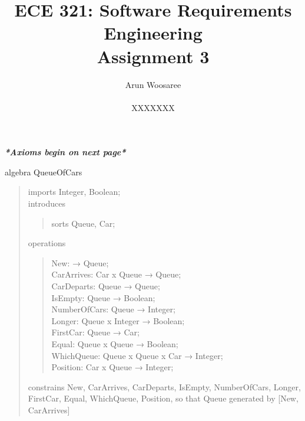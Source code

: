 \documentclass[letterpaper,12pt]{article}
\title{ECE 321: Software Requirements Engineering \\ Assignment 3}
\author{Arun Woosaree \\ \\ XXXXXXX}
\begin{document}
\maketitle
\begin{center}
 \textit{\textbf{*Axioms begin on next page*}}
\end{center}
algebra QueueOfCars
\begin{quote}
 imports Integer, Boolean;\\
 introduces
 \begin{quote}
  sorts Queue, Car;
 \end{quote}
 operations
 \begin{quote}
  New: → Queue;\\
  CarArrives: Car x Queue → Queue;\\
  CarDeparts: Queue → Queue;\\
  IsEmpty: Queue → Boolean;\\
  NumberOfCars: Queue → Integer;\\
  Longer: Queue x Integer → Boolean;\\
  FirstCar: Queue → Car;\\
  Equal: Queue x Queue → Boolean;\\
  WhichQueue: Queue x Queue x Car → Integer;\\
  Position: Car x Queue → Integer;
 \end{quote}
 constrains New, CarArrives, CarDeparts, IsEmpty, NumberOfCars, Longer, FirstCar, Equal, WhichQueue, Position, so that Queue generated by [New, CarArrives]\\
 

\end{quote}
\end{document}

